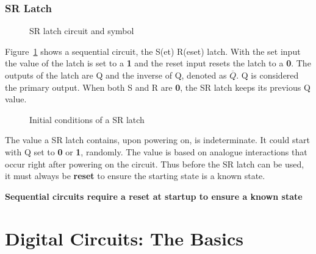 \documentclass[12pt, a4paper, oneside]{memoir}
\newcommand{\attention}[1]{\begin{center}\colorbox{attention}{\textbf{#1}}\end{center}}
\begin{document}
\subsection{SR Latch}
\begin{figure}[ht]
  \centering
  \raisebox{-25pt}{}
  \hspace{15pt}
  \raisebox{ -5pt}{}
  \hspace{10pt}
  \caption{SR latch circuit and symbol}
  \label{fig:srlatch}
\end{figure}
\noindent
Figure~\ref{fig:srlatch} shows a sequential circuit, the S(et) R(eset) latch. With the set input the value of the latch is set to a \textbf{1} and the reset input resets the latch to a \textbf{0}. 
The outputs of the latch are Q and the inverse of Q, denoted as $\overline{Q}$. Q is considered the primary output.
When both S and R are \textbf{0}, the SR latch keeps its previous Q value.

\begin{figure}[ht]
  \centering
  
  \hspace{20pt}
  
  \caption{Initial conditions of a SR latch}
  \label{fig:initialsrlatch}
\end{figure}
\noindent
The value a SR latch contains, upon powering on, is indeterminate. It could start with Q set to \textbf{0} or \textbf{1}, randomly.
The value is based on analogue interactions that occur right after powering on the circuit.
Thus before the SR latch can be used, it must always be \textbf{reset} to ensure the starting state is a known state.
\attention{Sequential circuits require a reset at startup to ensure a known state}

\chapter*{Digital Circuits: The Basics}
\end{document}
